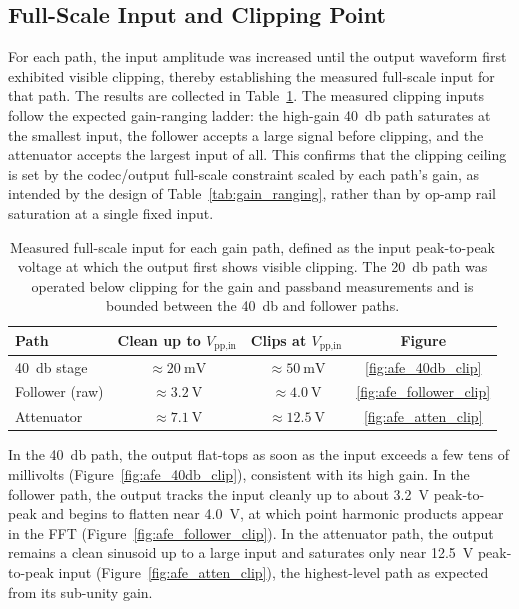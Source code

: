 \subsection{Full-Scale Input and Clipping Point}
\label{sec:res_afe_clipping}

For each path, the input amplitude was increased until the output waveform first exhibited visible clipping, thereby establishing the measured full-scale input for that path. The results are collected in Table~\ref{tab:res_afe_clipping}. The measured clipping inputs follow the expected gain-ranging ladder: the high-gain \SI{40}{\decibel} path saturates at the smallest input, the follower accepts a large signal before clipping, and the attenuator accepts the largest input of all. This confirms that the clipping ceiling is set by the codec/output full-scale constraint scaled by each path's gain, as intended by the design of Table~\ref{tab:gain_ranging}, rather than by op-amp rail saturation at a single fixed input.

\begin{table}[h!]
\centering
\begin{tabular}{lccc}
\hline
\textbf{Path} & \textbf{Clean up to $V_{\text{pp,in}}$} & \textbf{Clips at $V_{\text{pp,in}}$} & \textbf{Figure} \\
\hline
\SI{40}{\decibel} stage & $\approx\SI{20}{\milli\volt}$ & $\approx\SI{50}{\milli\volt}$ & \ref{fig:afe_40db_clip} \\
Follower (raw)          & $\approx\SI{3.2}{\volt}$      & $\approx\SI{4.0}{\volt}$      & \ref{fig:afe_follower_clip} \\
Attenuator              & $\approx\SI{7.1}{\volt}$      & $\approx\SI{12.5}{\volt}$     & \ref{fig:afe_atten_clip} \\
\hline
\end{tabular}
\caption{Measured full-scale input for each gain path, defined as the input peak-to-peak voltage at which the output first shows visible clipping. The \SI{20}{\decibel} path was operated below clipping for the gain and passband measurements and is bounded between the \SI{40}{\decibel} and follower paths.}
\label{tab:res_afe_clipping}
\end{table}

In the \SI{40}{\decibel} path, the output flat-tops as soon as the input exceeds a few tens of millivolts (Figure~\ref{fig:afe_40db_clip}), consistent with its high gain. In the follower path, the output tracks the input cleanly up to about \SI{3.2}{\volt} peak-to-peak and begins to flatten near \SI{4.0}{\volt}, at which point harmonic products appear in the FFT (Figure~\ref{fig:afe_follower_clip}). In the attenuator path, the output remains a clean sinusoid up to a large input and saturates only near \SI{12.5}{\volt} peak-to-peak input (Figure~\ref{fig:afe_atten_clip}), the highest-level path as expected from its sub-unity gain.

